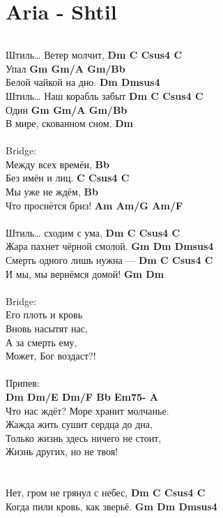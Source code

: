 \section{Aria - Shtil}
\begin{verbatim}
\end{verbatim}
Штиль… Ветер молчит,		\textbf{Dm C Csus4 C}\\
Упал				\textbf{Gm Gm/A Gm/Bb}\\
Белой чайкой на дно.		\textbf{Dm Dmsus4}\\
Штиль… Наш корабль забыт	\textbf{Dm C Csus4 C}\\
Один				\textbf{Gm Gm/A Gm/Bb}\\
В мире, скованном сном.		\textbf{Dm}\\
\\
Bridge:\\
   Между всех времён,		\textbf{Bb}\\
   Без имён и лиц.		\textbf{C Csus4 C}\\
   Мы уже не ждём,		\textbf{Bb}\\
   Что проснётся бриз!		\textbf{Am Am/G Am/F}\\
\\
Штиль… сходим с ума,		\textbf{Dm C Csus4 C}\\
Жара пахнет чёрной смолой.	\textbf{Gm Dm Dmsus4}\\
Смерть одного лишь нужна —	\textbf{Dm C Csus4 C}\\
И мы, мы вернёмся домой!	\textbf{Gm Dm}\\
\\
Bridge:\\
Его плоть и кровь\\
Вновь насытят нас,\\
А за смерть ему,\\
Может, Бог воздаст?!\\
\\
Припев:\\
\textbf{Dm Dm/E Dm/F Bb Em75- A}\\
Что нас ждёт? Море хранит молчанье.\\
Жажда жить сушит сердца до дна,\\
Только жизнь здесь ничего не стоит,\\
Жизнь других, но не твоя!\\
\\
\\
Нет, гром не грянул с небес,		\textbf{Dm C Csus4 C}\\
Когда пили кровь, как зверьё.		\textbf{Gm Dm Dmsus4}\\
